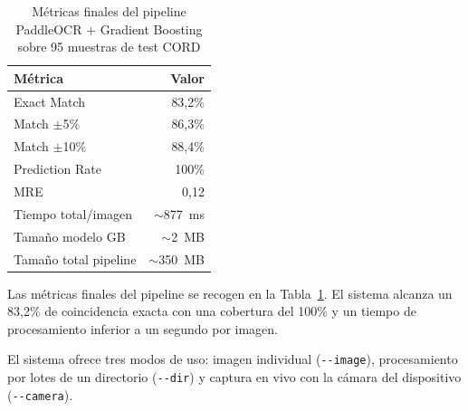 \begin{table}[htbp]
    \centering
    \caption{Métricas finales del pipeline PaddleOCR + Gradient Boosting sobre 95 muestras de test CORD}
    \label{tab:metricas_finales}
    \begin{tabular}{lr}
        \toprule
        \textbf{Métrica} & \textbf{Valor} \\
        \midrule
        Exact Match & 83,2\% \\
        Match $\pm$5\% & 86,3\% \\
        Match $\pm$10\% & 88,4\% \\
        Prediction Rate & 100\% \\
        MRE & 0,12 \\
        Tiempo total/imagen & $\sim$877~ms \\
        Tamaño modelo GB & $\sim$2~MB \\
        Tamaño total pipeline & $\sim$350~MB \\
        \bottomrule
    \end{tabular}
\end{table}

Las métricas finales del pipeline se recogen en la Tabla~\ref{tab:metricas_finales}. El sistema alcanza un 83,2\% de coincidencia exacta con una cobertura del 100\% y un tiempo de procesamiento inferior a un segundo por imagen.

El sistema ofrece tres modos de uso: imagen individual (\texttt{-{}-image}), procesamiento por lotes de un directorio (\texttt{-{}-dir}) y captura en vivo con la cámara del dispositivo (\texttt{-{}-camera}).
